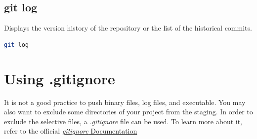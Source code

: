 \documentclass[letterpaper]{article}
\begin{document}
\subsection{git log}
Displays the version history of the repository or the list of the historical commits. 
\begin{lstlisting}[language=Bash]
git log
\end{lstlisting}

\section{Using .gitignore}
It is not a good practice to push binary files, log files, and executable. You may also want to exclude some directories of your project from the staging. In order to exclude the selective files, a \textit{.gitignore} file can be used. To learn more about it, refer to the official \href{https://git-scm.com/docs/gitignore}{\textit{gitignore} Documentation}
\end{document}
